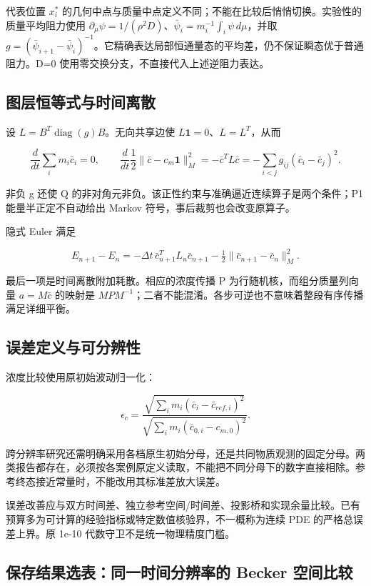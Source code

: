 \documentclass[
  10pt,
  a4paper,
]{article}
\begin{document}
代表位置 \(x_i^*\)
的几何中点与质量中点定义不同；不能在比较后悄悄切换。实验性的质量平均阻力使用
\(\partial_\mu\psi=1/(\rho^2D)\)、\(\bar\psi_i=m_i^{-1}\int_i\psi\,d\mu\)，并取
\(g=(\bar\psi_{i+1}-\bar\psi_i)^{-1}\)。它精确表达局部恒通量态的平均差，仍不保证瞬态优于普通阻力。D=0
使用零交换分支，不直接代入上述逆阻力表达。

\subsection{图层恒等式与时间离散}\label{ux56feux5c42ux6052ux7b49ux5f0fux4e0eux65f6ux95f4ux79bbux6563}

设 \(L=B^T\operatorname{diag}(g)B\)。无向共享边使
\(L\mathbf1=0\)、\(L=L^T\)，从而

\[
\frac{d}{dt}\sum_i m_i\bar c_i=0,\qquad
\frac{d}{dt}\frac12\|\bar c-c_m\mathbf1\|_M^2
=-\bar c^TL\bar c=-\sum_{i<j}g_{ij}(\bar c_i-\bar c_j)^2.
\]

非负 g 还使 Q 的非对角元非负。该正性约束与准确逼近连续算子是两个条件；P1
能量半正定不自动给出 Markov 符号，事后裁剪也会改变原算子。

隐式 Euler 满足

\[
E_{n+1}-E_n=-\Delta t\,\bar c_{n+1}^TL_n\bar c_{n+1}
-\tfrac12\|\bar c_{n+1}-\bar c_n\|_M^2.
\]

最后一项是时间离散附加耗散。相应的浓度传播 P
为行随机核，而组分质量列向量 \(a=M\bar c\) 的映射是
\(MPM^{-1}\)；二者不能混淆。各步可逆也不意味着整段有序传播满足详细平衡。

\subsection{误差定义与可分辨性}\label{ux8befux5deeux5b9aux4e49ux4e0eux53efux5206ux8fa8ux6027}

浓度比较使用原初始波动归一化：

\[
\epsilon_c=\frac{\sqrt{\sum_i m_i(\bar c_i-\bar c_{ref,i})^2}}
{\sqrt{\sum_i m_i(\bar c_{0,i}-c_{m,0})^2}}.
\]

跨分辨率研究还需明确采用各档原生初始分母，还是共同物质观测的固定分母。两类报告都存在，必须按各案例原定义读取，不能把不同分母下的数字直接相除。参考终态接近常量时，不能改用其标准差放大误差。

误差改善应与双方时间差、独立参考空间/时间差、投影桥和实现余量比较。已有预算多为可计算的经验指标或特定数值核验界，不一概称为连续
PDE 的严格总误差上界。原 1e-10 代数守卫不是统一物理精度门槛。

\subsection{保存结果选表：同一时间分辨率的 Becker
空间比较}\label{ux4fddux5b58ux7ed3ux679cux9009ux8868ux540cux4e00ux65f6ux95f4ux5206ux8fa8ux7387ux7684-becker-ux7a7aux95f4ux6bd4ux8f83}
\end{document}
